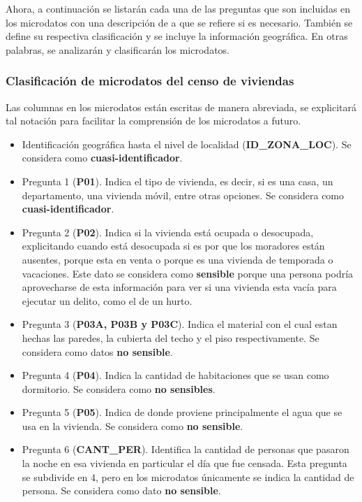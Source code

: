 \documentclass[informe]{upropuesta}
\begin{document}
Ahora, a continuación se listarán cada una de las preguntas que son incluidas en los microdatos con una descripción de a que se refiere si es necesario. También se define su respectiva clasificación y se incluye la información geográfica. En otras palabras, se analizarán y clasificarán los microdatos. 

\subsubsection*{Clasificación de microdatos del censo de viviendas}

Las columnas en los microdatos están escritas de manera abreviada, se explicitará tal notación para facilitar la comprensión de los microdatos a futuro.

\begin{itemize}
    \item Identificación geográfica hasta el nivel de localidad (\textbf{ID\_ZONA\_LOC}).
    Se considera como \textbf{cuasi-identificador}.
    \item Pregunta 1 (\textbf{P01}). Indica el tipo de vivienda, es decir, si es una casa, un departamento, una vivienda móvil, entre otras opciones. Se considera como \textbf{cuasi-identificador}.
    \item Pregunta 2 (\textbf{P02}). Indica si la vivienda está ocupada o desocupada, explicitando cuando está desocupada si es por que los moradores están ausentes, porque esta en venta o porque es una vivienda de temporada o vacaciones. Este dato se considera como \textbf{sensible} porque una persona podría aprovecharse de esta información para ver si una vivienda esta vacía para ejecutar un delito, como el de un hurto.
    \item Pregunta 3 (\textbf{P03A, P03B y P03C}). Indica el material con el cual estan hechas las paredes, la cubierta del techo y el piso respectivamente. Se considera como datos \textbf{no sensible}. %
    \item Pregunta 4 (\textbf{P04}). Indica la cantidad de habitaciones que se usan como dormitorio. Se considera como \textbf{no sensibles}.
    \item Pregunta 5 (\textbf{P05}). Indica de donde proviene principalmente el agua que se usa en la vivienda. Se considera como \textbf{no sensible}.
    \item Pregunta 6 (\textbf{CANT\_PER}). Identifica la cantidad de personas que pasaron la noche en esa vivienda en particular el día que fue censada. Esta pregunta se subdivide en 4, pero en los microdatos únicamente se indica la cantidad de persona. Se considera como dato \textbf{no sensible}.
\end{itemize}
\end{document}
